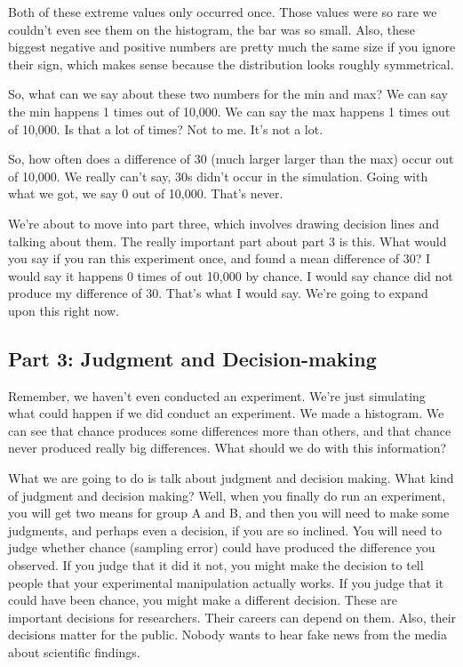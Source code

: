 \documentclass[
]{book}
\begin{document}
Both of these extreme values only occurred once. Those values were so rare we couldn't even see them on the histogram, the bar was so small. Also, these biggest negative and positive numbers are pretty much the same size if you ignore their sign, which makes sense because the distribution looks roughly symmetrical.

So, what can we say about these two numbers for the min and max? We can say the min happens 1 times out of 10,000. We can say the max happens 1 times out of 10,000. Is that a lot of times? Not to me. It's not a lot.

So, how often does a difference of 30 (much larger larger than the max) occur out of 10,000. We really can't say, 30s didn't occur in the simulation. Going with what we got, we say 0 out of 10,000. That's never.

We're about to move into part three, which involves drawing decision lines and talking about them. The really important part about part 3 is this. What would you say if you ran this experiment once, and found a mean difference of 30? I would say it happens 0 times of out 10,000 by chance. I would say chance did not produce my difference of 30. That's what I would say. We're going to expand upon this right now.

\hypertarget{part-3-judgment-and-decision-making}{%
\subsection{Part 3: Judgment and Decision-making}\label{part-3-judgment-and-decision-making}}

Remember, we haven't even conducted an experiment. We're just simulating what could happen if we did conduct an experiment. We made a histogram. We can see that chance produces some differences more than others, and that chance never produced really big differences. What should we do with this information?

What we are going to do is talk about judgment and decision making. What kind of judgment and decision making? Well, when you finally do run an experiment, you will get two means for group A and B, and then you will need to make some judgments, and perhaps even a decision, if you are so inclined. You will need to judge whether chance (sampling error) could have produced the difference you observed. If you judge that it did it not, you might make the decision to tell people that your experimental manipulation actually works. If you judge that it could have been chance, you might make a different decision. These are important decisions for researchers. Their careers can depend on them. Also, their decisions matter for the public. Nobody wants to hear fake news from the media about scientific findings.
\end{document}
